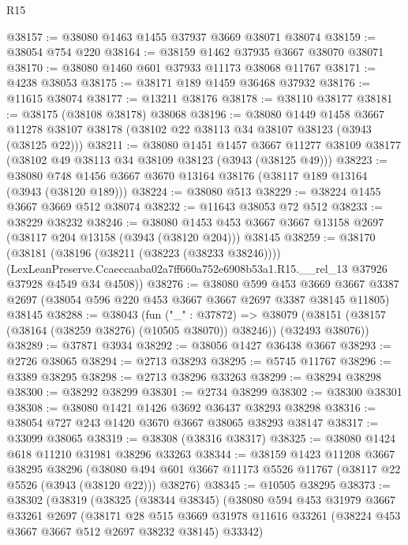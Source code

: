 \begin{lexlean}{R15}
\begin{coremodule}
@38157 := @38080 @1463 @1455 @37937 @3669 @38071 @38074
@38159 := @38054 @754 @220
@38164 := @38159 @1462 @37935 @3667 @38070 @38071
@38170 := @38080 @1460 @601 @37933 @11173 @38068 @11767
@38171 := @4238 @38053
@38175 := @38171 @189 @1459 @36468 @37932
@38176 := @11615 @38074
@38177 := @13211 @38176
@38178 := @38110 @38177
@38181 := @38175 (@38108 @38178) @38068
@38196 := @38080
    @1449
    @1458
    @3667
    @11278
    @38107
    @38178
    (@38102 @22 @38113 @34 @38107 @38123 (@3943 (@38125 @22)))
@38211 := @38080
    @1451
    @1457
    @3667
    @11277
    @38109
    @38177
    (@38102 @49 @38113 @34 @38109 @38123 (@3943 (@38125 @49)))
@38223 := @38080 @748 @1456 @3667 @3670 @13164 @38176 (@38117 @189 @13164 (@3943 (@38120 @189)))
@38224 := @38080 @513
@38229 := @38224 @1455 @3667 @3669 @512 @38074
@38232 := @11643 @38053 @72 @512
@38233 := @38229 @38232
@38246 := @38080
    @1453
    @453
    @3667
    @3667
    @13158
    @2697
    (@38117 @204 @13158 (@3943 (@38120 @204)))
    @38145
@38259 := @38170
    (@38181
      (@38196 (@38211 (@38223 (@38233 @38246))))
      (LexLeanPreserve.Ccaeccaaba02a7ff660a752e6908b53a1.R15.__rel_13
        @37926
        @37928
        @4549
        @34
        @4508))
@38276 := @38080
    @599
    @453
    @3669
    @3667
    @3387
    @2697
    (@38054 @596 @220 @453 @3667 @3667 @2697 @3387 @38145 @11805)
    @38145
@38288 := @38043
    (fun ("_" : @37872) =>
    @38079 (@38151 (@38157 (@38164 (@38259 @38276) (@10505 @38070)) @38246)) (@32493 @38076))
@38289 := @37871 @3934
@38292 := @38056 @1427 @36438 @3667
@38293 := @2726 @38065
@38294 := @2713 @38293
@38295 := @5745 @11767
@38296 := @3389 @38295
@38298 := @2713 @38296 @33263
@38299 := @38294 @38298
@38300 := @38292 @38299
@38301 := @2734 @38299
@38302 := @38300 @38301
@38308 := @38080 @1421 @1426 @3692 @36437 @38293 @38298
@38316 := @38054 @727 @243 @1420 @3670 @3667 @38065 @38293 @38147
@38317 := @33099 @38065
@38319 := @38308 (@38316 @38317)
@38325 := @38080 @1424 @618 @11210 @31981 @38296 @33263
@38344 := @38159
    @1423
    @11208
    @3667
    @38295
    @38296
    (@38080 @494 @601 @3667 @11173 @5526 @11767 (@38117 @22 @5526 (@3943 (@38120 @22))) @38276)
@38345 := @10505 @38295
@38373 := @38302
    (@38319
      (@38325
        (@38344 @38345)
        (@38080
          @594
          @453
          @31979
          @3667
          @33261
          @2697
          (@38171
            @28
            @515
            @3669
            @31978
            @11616
            @33261
            (@38224 @453 @3667 @3667 @512 @2697 @38232 @38145)
            @33342)

\end{coremodule}
\end{lexlean}
